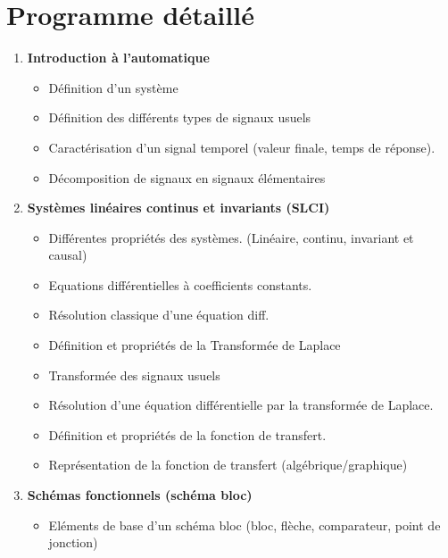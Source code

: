 \documentclass[a4paper,11pt]{article}
\begin{document}
\section*{Programme détaillé}
\begin{enumerate}
    \item \textbf{Introduction à l'automatique}
        \begin{itemize}
            \item Définition d'un système
            \item Définition des différents types de signaux usuels
            \item Caractérisation d'un signal temporel (valeur finale, temps de réponse).
            \item Décomposition de signaux en signaux élémentaires 
        \end{itemize}
    \item \textbf{Systèmes linéaires continus et invariants (SLCI)}
        \begin{itemize}
            \item Différentes propriétés des systèmes. (Linéaire, continu, invariant et causal)
            \item Equations différentielles à coefficients constants.
            \item Résolution classique d'une équation diff.
            \item Définition et propriétés de la Transformée de Laplace
            \item Transformée des signaux usuels
            \item Résolution d'une équation différentielle par la transformée de Laplace.
            \item Définition et propriétés de la fonction de transfert.
            \item Représentation de la fonction de transfert (algébrique/graphique)
        \end{itemize}
    \item \textbf{Schémas fonctionnels (schéma bloc)}
        \begin{itemize} 
            \item Eléments de base d'un schéma bloc (bloc, flèche, comparateur, point de jonction)

\end{itemize}
\end{enumerate}
\end{document}
